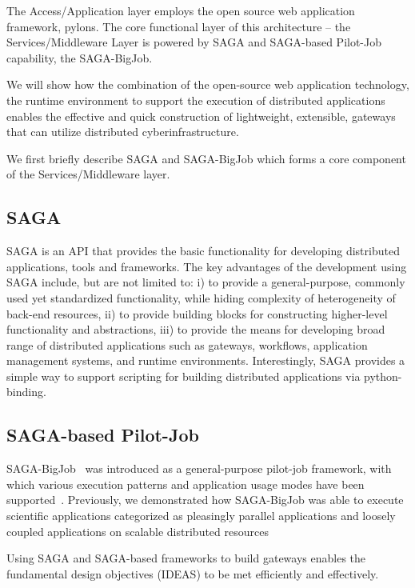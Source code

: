 \documentclass[]{article}
\begin{document}
The Access/Application layer employs the open source web application
framework, pylons\cite{pylonsurl}.  The core functional layer of this
architecture -- the Services/Middleware Layer is powered by SAGA and
SAGA-based Pilot-Job capability, the
SAGA-BigJob\cite{saga-ccgrid10}. 

We will show how the combination of the open-source web application
technology, the runtime environment to support the execution of
distributed applications enables the effective and quick construction
of lightweight, extensible, gateways that can utilize
distributed cyberinfrastructure. 


We first briefly describe SAGA and SAGA-BigJob which forms a core
component of the Services/Middleware layer.
 


\subsection{SAGA}
SAGA is an API that provides the basic functionality for developing
distributed applications, tools and frameworks\cite{saga_url}. The key
advantages of the development using SAGA include, but are not limited
to: i) to provide a general-purpose, commonly used yet standardized
functionality, while hiding complexity of heterogeneity of back-end
resources, ii) to provide building blocks for constructing
higher-level functionality and abstractions, iii) to provide the means
for developing broad range of distributed applications such as
gateways, workflows, application management systems, and runtime
environments.  Interestingly, SAGA provides a simple way to support
scripting for building distributed applications via python-binding.


\subsection{SAGA-based Pilot-Job}

SAGA-BigJob~\cite{saga-ccgrid10} was introduced as a general-purpose
pilot-job framework, with which various execution patterns and
application usage modes have been
supported~\cite{async_repex11,saga-royalsoc}.  Previously, we
demonstrated how SAGA-BigJob was able to execute scientific
applications categorized as pleasingly parallel applications and
loosely coupled applications on scalable distributed
resources\cite{jha2009developing, ecmls10, ecmls11}

Using SAGA and SAGA-based frameworks to build gateways enables the
fundamental design objectives (IDEAS) to be met efficiently and
effectively.
\end{document}
